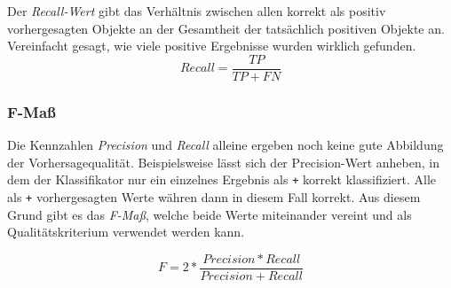 Der \textit{Recall-Wert} gibt das Verhältnis zwischen allen korrekt als positiv vorhergesagten Objekte an der Gesamtheit der tatsächlich positiven Objekte an. Vereinfacht gesagt, wie viele positive Ergebnisse wurden wirklich gefunden.
$$Recall = \frac{TP}{TP + FN}$$

\subsubsection{F-Maß}

Die Kennzahlen \textit{Precision} und \textit{Recall} alleine ergeben noch keine gute Abbildung der Vorhersagequalität.
Beispielsweise lässt sich der Precision-Wert anheben, in dem der Klassifikator nur ein einzelnes Ergebnis als \texttt{+} korrekt klassifiziert.
Alle als \texttt{+} vorhergesagten Werte währen dann in diesem Fall korrekt.
Aus diesem Grund gibt es das \textit{F-Maß}, welche beide Werte miteinander vereint und als Qualitätskriterium verwendet werden kann.

$$F = 2 * \frac{Precision * Recall}{Precision + Recall}$$